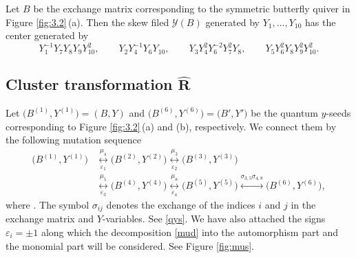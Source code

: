 \documentclass[pdftex]{sigma}
\newcommand\bY{Y}
\numberwithin{equation}{section}
\begin{document}
\begin{Remark}\label{re:c1}
 Let $B$ be the exchange matrix corresponding to the symmetric
 butterfly quiver in Figure \ref{fig:3.2}\,(a). Then the skew filed
 $\mathcal{Y}(B)$ generated by $Y_1, \dots, Y_{10}$ has the center
 generated by
\[
Y^{-1}_1Y_7Y_8Y_9Y^2_{10},\qquad
Y_2Y^{-1}_4Y_6Y_{10},\qquad
Y_3Y^2_4Y^{-2}_6Y^2_7Y_8,\qquad
Y_5Y^2_6Y_8Y^2_9Y^2_{10}.
\]


\end{Remark}

\subsection[Cluster transformation R]{Cluster transformation $\boldsymbol{\widehat{R}}$}

Let $\bigl(B^{(1)}, \bY^{(1)}\bigr) = (B, \bY)$ and
$\bigl(B^{(6)}, \bY^{(6)}\bigr) = \bigl(B', \bY'\bigr)$ be the quantum $y$-seeds corresponding to Figure \ref{fig:3.2}\,(a) and (b), respectively.
We connect them by the following mutation sequence
%
\begin{align}
\bigl(B^{(1)}, \bY^{(1)}\bigr) &\underset{\varepsilon_1}{\overset{\mu_4}{\longleftrightarrow}}
\bigl(B^{(2)}, \bY^{(2)}\bigr) \underset{\varepsilon_2}{\overset{\mu_3}{\longleftrightarrow}}
\bigl(B^{(3)}, \bY^{(3)}\bigr)\nonumber
\\
&\underset{\varepsilon_3}{\overset{\mu_5}{\longleftrightarrow}}
\bigl(B^{(4)}, \bY^{(4)}\bigr) \underset{\varepsilon_4}{\overset{\mu_8}{\longleftrightarrow}}
\bigl(B^{(5)}, \bY^{(5)}\bigr) \overset{\sigma_{3,5}\sigma_{4,8}}{\longleftrightarrow}
\bigl(B^{(6)}, \bY^{(6)}\bigr),\label{mus}
\end{align}
where \smash{$\bY^{(t)}=\bigl(Y^{(t)}_1,\dotsc, Y^{(t)}_{10}\bigr)$}. The symbol
$\sigma_{ij}$ denotes the exchange of the indices $i$ and $j$ in the
exchange matrix and $Y$-variables. See \eqref{qys}. We have also
attached the signs $\varepsilon_i=\pm 1$ along which the decomposition
\eqref{mud} into the automorphism part and the monomial part will be
considered. See Figure \ref{fig:mus}.
\end{document}
